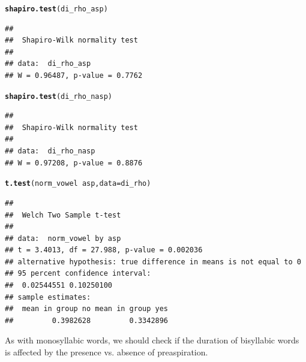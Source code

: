 \documentclass[a4paper,11pt]{article}\usepackage[]{graphicx}\usepackage[]{color}
\makeatletter
\newcommand{\hlopt}[1]{\textcolor[rgb]{0,0,0}{#1}}%
\newcommand{\hlstd}[1]{\textcolor[rgb]{0.345,0.345,0.345}{#1}}%
\newcommand{\hlkwc}[1]{\textcolor[rgb]{0.333,0.667,0.333}{#1}}%
\newcommand{\hlkwd}[1]{\textcolor[rgb]{0.737,0.353,0.396}{\textbf{#1}}}%
\newenvironment{kframe}{%
 \def\at@end@of@kframe{}%
 \ifinner\ifhmode%
  \def\at@end@of@kframe{\end{minipage}}%
  \begin{minipage}{\columnwidth}%
 \fi\fi%
 \def\FrameCommand##1{\hskip\@totalleftmargin \hskip-\fboxsep
 \colorbox{shadecolor}{##1}\hskip-\fboxsep
     \hskip-\linewidth \hskip-\@totalleftmargin \hskip\columnwidth}%
 \MakeFramed {\advance\hsize-\width
   \@totalleftmargin\z@ \linewidth\hsize
   \@setminipage}}%
 {\par\unskip\endMakeFramed%
 \at@end@of@kframe}
\newenvironment{knitrout}{}{} %
\makeatother
\begin{document}
\begin{knitrout}
\color{fgcolor}\begin{kframe}
\begin{alltt}
\hlkwd{shapiro.test}\hlstd{(di_rho_asp)}
\end{alltt}
\begin{verbatim}
## 
## 	Shapiro-Wilk normality test
## 
## data:  di_rho_asp
## W = 0.96487, p-value = 0.7762
\end{verbatim}
\begin{alltt}
\hlkwd{shapiro.test}\hlstd{(di_rho_nasp)}
\end{alltt}
\begin{verbatim}
## 
## 	Shapiro-Wilk normality test
## 
## data:  di_rho_nasp
## W = 0.97208, p-value = 0.8876
\end{verbatim}
\begin{alltt}
\hlkwd{t.test}\hlstd{(norm_vowel} \hlopt{~} \hlstd{asp,} \hlkwc{data} \hlstd{= di_rho)}
\end{alltt}
\begin{verbatim}
## 
## 	Welch Two Sample t-test
## 
## data:  norm_vowel by asp
## t = 3.4013, df = 27.988, p-value = 0.002036
## alternative hypothesis: true difference in means is not equal to 0
## 95 percent confidence interval:
##  0.02544551 0.10250100
## sample estimates:
##  mean in group no mean in group yes 
##         0.3982628         0.3342896
\end{verbatim}
\end{kframe}
\end{knitrout}

As with monosyllabic words, we should check if the duration of bisyllabic words is affected by the presence vs. absence of preaspiration.
\end{document}
